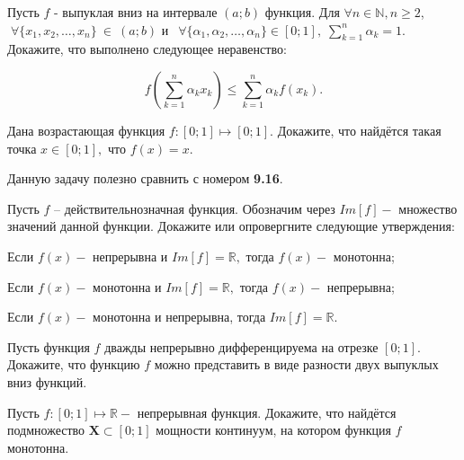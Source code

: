 \documentclass[10pt]{article}
\begin{document}
\vspace{-3ex}
\begin{problem}

Пусть $f$ - выпуклая вниз на интервале $(a; b)$ функция.
Для $\forall  n \in \mathbb{N},  n  \ge 2$, $\; \forall \{x_1, x_2, \ldots ,x_n\}~\in~(a; b)$ и
$\;\, \forall \{\alpha_1, \alpha_2, \ldots ,\alpha_n\} \in [0; 1], \; \sum\limits_{k=1}^n \alpha_k = 1.$ Докажите, что выполнено следующее неравенство:
\vspace{-3ex}

$$
f\left(\sum\limits_{k=1}^n \alpha_k x_k\right) \le \sum\limits_{k=1}^n \alpha_k f(x_k).
$$
\end{problem}
\vspace{-3ex}

\begin{problem}
 Дана возрастающая функция $f : [0; 1] \mapsto [0; 1].$ Докажите, что найдётся такая точка $x \in [0; 1],$ что $f(x) = x.$
\end{problem}

\vspace{2ex}

\begin{remark}
 Данную задачу полезно сравнить с номером \textbf{9.16}.
\end{remark}

\vspace{-1ex}
\begin{problem}
 Пусть $f$ -- действительнозначная функция. Обозначим через $Im[f] - $ множество значений данной функции. Докажите или опровергните следующие утверждения:

Если $f(x) - $ непрерывна и $Im[f] = \mathbb{R},$ тогда $f(x) - $ монотонна;

Если $f(x) - $ монотонна и $Im[f] = \mathbb{R},$ тогда $f(x) - $ непрерывна;

Если $f(x) - $ монотонна и непрерывна, тогда $Im[f] = \mathbb{R}$.
\end{problem}

\vspace{-1ex}
\begin{problem}
Пусть функция $f$ дважды непрерывно дифференцируема на отрезке $[0; 1].$ Докажите, что функцию $f$ можно представить в виде разности двух выпуклых вниз функций.
\end{problem}

\begin{problem}
 Пусть $f : [0; 1] \mapsto \mathbb{R} - $ непрерывная функция. Докажите, что найдётся подмножество $\textbf{X} \subset [0; 1]$ мощности континуум, на котором функция $f$ монотонна.
\end{problem}
\end{document}
